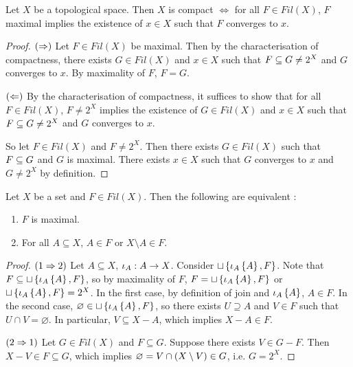 \documentclass[main.tex]{subfiles}
\begin{document}
\begin{cor} 
  
  Let $X$ be a topological space. 
  Then $X$ is compact $\iff$ for all $F \in Fil(X)$, 
  $F$ maximal implies the existence of $x \in X$ such that 
  $F$ converges to $x$.
\end{cor}
\begin{proof}
  $(\Rightarrow)$ Let $F \in Fil(X)$ be maximal. 
  Then by the characterisation of compactness, 
  there exists $G \in Fil(X)$ and $x \in X$ such that
  $F \subseteq G \neq 2^X$ and $G$ converges to $x$.
  By maximality of $F$, $F = G$.

  $(\Leftarrow)$ By the characterisation of compactness,
  it suffices to show that for all $F \in Fil(X)$,
  $F \neq 2^X$ implies the existence of 
  $G \in Fil(X)$ and $x \in X$
  such that $F \subseteq G \neq 2^X$ and $G$ converges to $x$.

  So let $F \in Fil(X)$ and $F \neq 2^X$.
  Then there exists $G \in Fil(X)$ such that 
  $F \subseteq G$ and $G$ is maximal. 
  There exists $x \in X$ such that $G$ converges to $x$
  and $G \neq 2^X$ by definition.
\end{proof}

\begin{thm} 
  
  Let $X$ be a set and $F \in Fil(X)$.
  Then the following are equivalent : 
  \begin{enumerate}
    \item $F$ is maximal. 
    \item For all $A \subseteq X$, $A \in F$ or $X\setminus A \in F$.
  \end{enumerate}
\end{thm}
\begin{proof}
  $(1\Rightarrow 2)$ Let $A \subseteq X$, $\iota_A : A \to X$.
  Consider $\sqcup\left\{\iota_A\left\{A\right\},F\right\}$.
  Note that $F \subseteq \sqcup\left\{\iota_A\left\{A\right\},F\right\}$,
  so by maximality of $F$, 
  $F = \sqcup\left\{\iota_A\left\{A\right\},F\right\}$ or $\sqcup\left\{\iota_A\left\{A\right\},F\right\} = 2^X$.
  In the first case, 
  by definition of join and $\iota_A\left\{A\right\}$, 
  $A \in F$.
  In the second case, 
  $\varnothing \in \sqcup\left\{\iota_A\left\{A\right\},F\right\}$,
  so there exists $U \supseteq A$ and $V \in F$ such that 
  $U \cap V = \varnothing$.
  In particular, $V \subseteq X\minus A$, 
  which implies $X\minus A \in F$.

  $(2\Rightarrow 1)$ Let $G \in Fil(X)$ and $F \subseteq G$.
  Suppose there exists $V \in G\minus F$.
  Then $X\minus V \in F \subseteq G$,
  which implies $\varnothing = V \cap \left(X\setminus V\right) \in G$,
  i.e. $G = 2^X$.
\end{proof}
\end{document}
